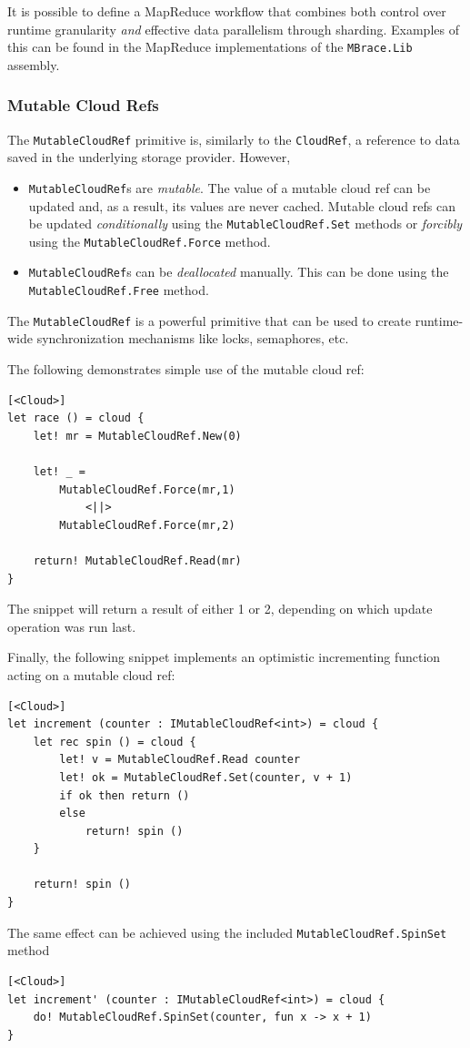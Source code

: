 \documentclass[9pt,a4paper]{article}
\begin{document}
It is possible to define a MapReduce workflow that combines both control
over runtime granularity \emph{and} effective data parallelism through sharding.
Examples of this can be found in the MapReduce implementations of the \texttt{MBrace.Lib}
assembly.

\subsubsection*{Mutable Cloud Refs}
\label{mutableCloudRef}

The \texttt{MutableCloudRef} primitive is, similarly to the \texttt{CloudRef},
a reference to data saved in the underlying storage provider. However,
\begin{itemize}
\item \texttt{MutableCloudRef}s are \emph{mutable}. The value of a mutable cloud ref
can be updated and, as a result, its values are never cached. Mutable cloud refs can
be updated \emph{conditionally} using the \texttt{MutableCloudRef.Set} methods or 
\emph{forcibly} using the \texttt{MutableCloudRef.Force} method.
\item \texttt{MutableCloudRef}s can be \emph{deallocated} manually. This can be done
using the \texttt{MutableCloudRef.Free} method.
\end{itemize}
The \texttt{MutableCloudRef} is a powerful primitive that can be used to create 
runtime-wide synchronization mechanisms like locks, semaphores, etc.

The following demonstrates simple use of the mutable cloud ref:
\begin{lstlisting}
[<Cloud>]
let race () = cloud {
    let! mr = MutableCloudRef.New(0)
 
    let! _ = 
    	MutableCloudRef.Force(mr,1)
    		<||> 
    	MutableCloudRef.Force(mr,2)
 
    return! MutableCloudRef.Read(mr)
}
\end{lstlisting}
The snippet will return a result of either 1 or 2, depending on which update operation
was run last.

Finally, the following snippet implements an optimistic incrementing function
acting on a mutable cloud ref:
\begin{lstlisting}
[<Cloud>]
let increment (counter : IMutableCloudRef<int>) = cloud {
    let rec spin () = cloud {
        let! v = MutableCloudRef.Read counter
        let! ok = MutableCloudRef.Set(counter, v + 1)
        if ok then return ()
        else
            return! spin ()
    }

    return! spin ()
}
\end{lstlisting}
The same effect can be achieved using the included 
\texttt{MutableCloudRef.SpinSet} method
\begin{lstlisting}
[<Cloud>]
let increment' (counter : IMutableCloudRef<int>) = cloud {
    do! MutableCloudRef.SpinSet(counter, fun x -> x + 1)
}
\end{lstlisting}
\end{document}

